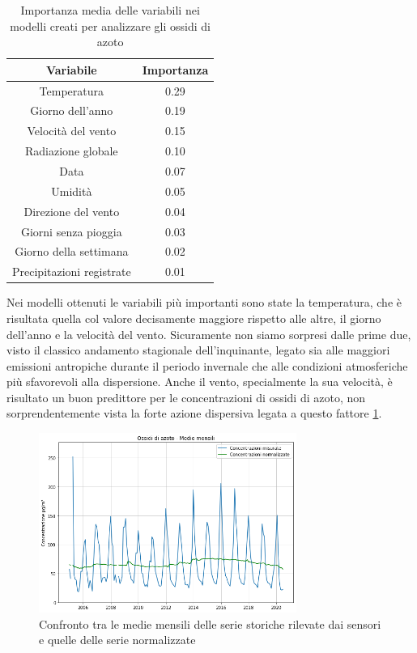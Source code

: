 \documentclass[a4paper,12pt]{report}
\begin{document}
\begin{table}[h!]
\centering
\begin{tabular}{ |c c| }
	\hline
	Variabile & Importanza \\
	\hline
	Temperatura & 0.29 \\
	Giorno dell'anno & 0.19 \\
	Velocità del vento & 0.15 \\
	Radiazione globale & 0.10 \\
	Data & 0.07 \\
	Umidità & 0.05 \\
	Direzione del vento & 0.04 \\
	Giorni senza pioggia & 0.03 \\
	Giorno della settimana & 0.02 \\
	Precipitazioni registrate & 0.01 \\
	\hline
\end{tabular}
\caption{Importanza media delle variabili nei modelli creati per analizzare gli ossidi di azoto}
\label{table:importanza_nox}
\end{table}

Nei modelli ottenuti le variabili più importanti sono state la temperatura, che è risultata quella col valore decisamente maggiore rispetto alle altre, il giorno dell'anno e la velocità del vento. Sicuramente non siamo sorpresi dalle prime due, visto il classico andamento stagionale dell'inquinante, legato sia alle maggiori emissioni antropiche durante il periodo invernale che alle condizioni atmosferiche più sfavorevoli alla dispersione. Anche il vento, specialmente la sua velocità, è risultato un buon predittore per le concentrazioni di ossidi di azoto, non sorprendentemente vista la forte azione dispersiva legata a questo fattore \ref{table:importanza_nox}.

\begin{figure}[h]
\centering
\includegraphics[width=0.75\textwidth]{nox_medie_mensili}
\caption{Confronto tra le medie mensili delle serie storiche rilevate dai sensori e quelle delle serie normalizzate}
\label{fig:nox_medie_mensili}
\end{figure}
\end{document}
